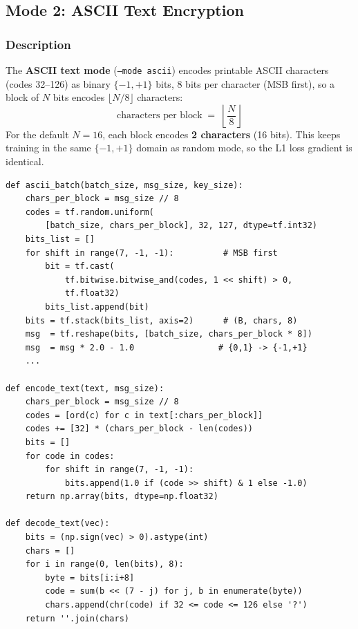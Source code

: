 \documentclass[12pt, a4paper]{article}
\newcommand{\code}[1]{\texttt{\color{CodeRed}#1}}
\begin{document}
\subsection{Mode 2: ASCII Text Encryption}
\label{subsec:mode_ascii}

\subsubsection*{Description}

The \textbf{ASCII text mode} (\code{--mode ascii}) encodes printable
ASCII characters (codes 32--126) as binary $\{-1,+1\}$ bits, 8 bits
per character (MSB first), so a block of $N$ bits encodes
$\lfloor N/8 \rfloor$ characters:
%
\begin{equation}
  \text{characters per block} \;=\; \left\lfloor \frac{N}{8} \right\rfloor
  \label{eq:chars_per_block}
\end{equation}
%
For the default $N=16$, each block encodes \textbf{2 characters}
(16 bits). This keeps training in the same $\{-1,+1\}$ domain as
random mode, so the L1 loss gradient is identical.

\begin{lstlisting}[caption={Bitwise ASCII encoding in \code{main\_enhanced.py}}]
def ascii_batch(batch_size, msg_size, key_size):
    chars_per_block = msg_size // 8
    codes = tf.random.uniform(
        [batch_size, chars_per_block], 32, 127, dtype=tf.int32)
    bits_list = []
    for shift in range(7, -1, -1):          # MSB first
        bit = tf.cast(
            tf.bitwise.bitwise_and(codes, 1 << shift) > 0,
            tf.float32)
        bits_list.append(bit)
    bits = tf.stack(bits_list, axis=2)      # (B, chars, 8)
    msg  = tf.reshape(bits, [batch_size, chars_per_block * 8])
    msg  = msg * 2.0 - 1.0                 # {0,1} -> {-1,+1}
    ...

def encode_text(text, msg_size):
    chars_per_block = msg_size // 8
    codes = [ord(c) for c in text[:chars_per_block]]
    codes += [32] * (chars_per_block - len(codes))
    bits = []
    for code in codes:
        for shift in range(7, -1, -1):
            bits.append(1.0 if (code >> shift) & 1 else -1.0)
    return np.array(bits, dtype=np.float32)

def decode_text(vec):
    bits = (np.sign(vec) > 0).astype(int)
    chars = []
    for i in range(0, len(bits), 8):
        byte = bits[i:i+8]
        code = sum(b << (7 - j) for j, b in enumerate(byte))
        chars.append(chr(code) if 32 <= code <= 126 else '?')
    return ''.join(chars)
\end{lstlisting}
\end{document}
